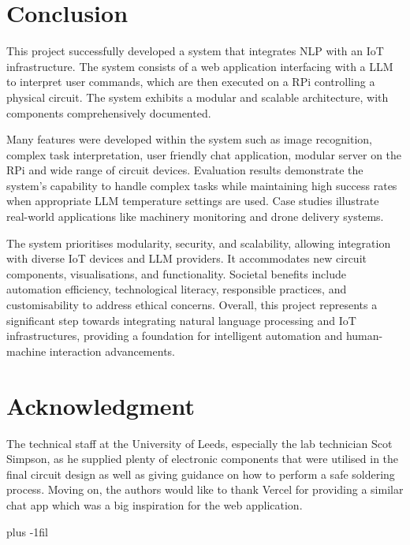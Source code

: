 \documentclass{ieeeaccess}
\begin{document}
\section{Conclusion}\label{sec:conclusion}
This project successfully developed a system that integrates NLP with an IoT infrastructure. The system consists of a web application interfacing with a LLM to interpret user commands, which are then executed on a RPi controlling a physical circuit. The system exhibits a modular and scalable architecture, with components comprehensively documented. 

Many features were developed within the system such as image recognition, complex task interpretation, user friendly chat application, modular server on the RPi and wide range of circuit devices. Evaluation results demonstrate the system's capability to handle complex tasks while maintaining high success rates when appropriate LLM temperature settings are used. Case studies illustrate real-world applications like machinery monitoring and drone delivery systems.

The system prioritises modularity, security, and scalability, allowing integration with diverse IoT devices and LLM providers. It accommodates new circuit components, visualisations, and functionality. Societal benefits include automation efficiency, technological literacy, responsible practices, and customisability to address ethical concerns. Overall, this project represents a significant step towards integrating natural language processing and IoT infrastructures, providing a foundation for intelligent automation and human-machine interaction advancements. 

\section*{Acknowledgment}
The technical staff at the University of Leeds, especially the lab technician Scot Simpson, as he supplied plenty of electronic components that were utilised in the final circuit design as well as giving guidance on how to perform a safe soldering process. Moving on, the authors would like to thank Vercel for providing a similar chat app which was a big inspiration for the web application.




\baselineskip plus -1fil
\end{document}
